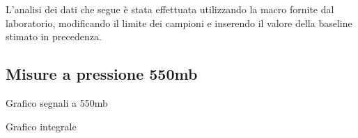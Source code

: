 
L'analisi dei dati che segue è stata effettuata utilizzando la macro fornite dal laboratorio,
modificando il limite dei campioni e inserendo il valore della baseline stimato in precedenza.

\subsection{Misure a pressione 550mb}

\begin{grafico}
 \centering
 \caption{Grafico segnali a 550mb} 
 \label{gr:misura_550} 
\end{grafico}

\begin{grafico}
 \centering
 \caption{Grafico integrale} 
 \label{gr:misura550_integral} 
\end{grafico}

